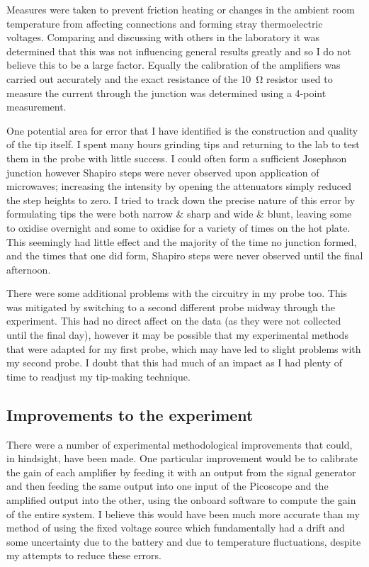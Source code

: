 \documentclass[11pt]{article}
\begin{document}
Measures were taken to prevent friction heating or changes in the ambient room temperature from affecting connections and forming stray thermoelectric voltages. Comparing and discussing with others in the laboratory it was determined that this was not influencing general results greatly and so I do not believe this to be a large factor. Equally the calibration of the amplifiers was carried out accurately and the exact resistance of the \SI{10}{\ohm} resistor used to measure the current through the junction was determined using a 4-point measurement. 

One potential area for error that I have identified is the construction and quality of the tip itself. I spent many hours grinding tips and returning to the lab to test them in the probe with little success. I could often form a sufficient Josephson junction however Shapiro steps were never observed upon application of microwaves; increasing the intensity by opening the attenuators simply reduced the step heights to zero. I tried to track down the precise nature of this error by formulating tips the were both narrow \& sharp and wide \& blunt, leaving some to oxidise overnight and some to oxidise for a variety of times on the hot plate. This seemingly had little effect and the majority of the time no junction formed, and the times that one did form, Shapiro steps were never observed until the final afternoon.

There were some additional problems with the circuitry in my probe too. This was mitigated by switching to a second different probe midway through the experiment. This had no direct affect on the data (as they were not collected until the final day), however it may be possible that my experimental methods that were adapted for my first probe, which may have led to slight problems with my second probe. I doubt that this had much of an impact as I had plenty of time to readjust my tip-making technique.

\subsection{Improvements to the experiment}
There were a number of experimental methodological improvements that could, in hindsight, have been made. One particular improvement would be to calibrate the gain of each amplifier by feeding it with an output from the signal generator and then feeding the same output into one input of the Picoscope and the amplified output into the other, using the onboard software to compute the gain of the entire system. I believe this would have been much more accurate than my method of using the fixed voltage source which fundamentally had a drift and some uncertainty due to the battery and due to temperature fluctuations, despite my attempts to reduce these errors.
\end{document}
